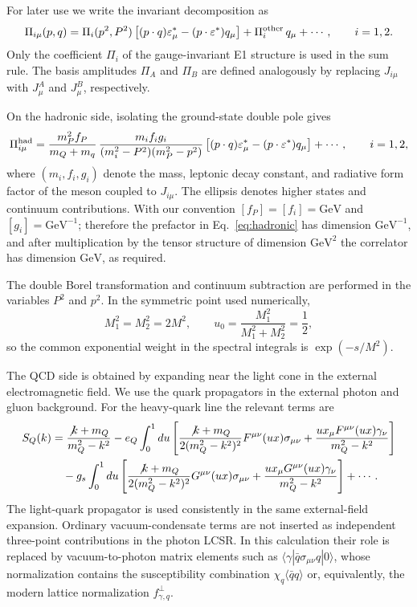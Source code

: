\documentclass[aps,prd,preprint,nofootinbib,superscriptaddress]{revtex4-2}
\newcommand{\GeV}{\mathrm{GeV}}
\newcommand{\qqbar}{\langle\bar q q\rangle}
\begin{document}
For later use we write the invariant decomposition as
\begin{equation}
  \Pi_{i\mu}(p,q)
  =
  \Pi_i(p^2,P^2)
  \left[(p\cdot q)\varepsilon_\mu^*
  -(p\cdot\varepsilon^*)q_\mu\right]
  +\Pi_i^{\rm other}\,q_\mu+\cdots ,
  \qquad i=1,2 .
  \label{eq:invariant-decomp}
\end{equation}
Only the coefficient $\Pi_i$ of the gauge-invariant E1 structure is used in
the sum rule.  The basis amplitudes $\Pi_A$ and $\Pi_B$ are defined analogously
by replacing $J_{i\mu}$ with $J_\mu^A$ and $J_\mu^B$, respectively.

On the hadronic side, isolating the ground-state double pole gives
\begin{equation}
  \Pi_{i\mu}^{\rm had}=
  \frac{m_P^2 f_P}{m_Q+m_q}\,
  \frac{m_i f_i g_i}
  {(m_i^2-P^2)(m_P^2-p^2)}
  \left[(p\cdot q)\varepsilon_\mu^*
  -(p\cdot\varepsilon^*)q_\mu\right]+\cdots ,
  \qquad i=1,2,
  \label{eq:hadronic}
\end{equation}
where $(m_i,f_i,g_i)$ denote the mass, leptonic decay constant, and radiative
form factor of the meson coupled to $J_{i\mu}$.  The ellipsis denotes higher
states and continuum contributions.  With our convention $[f_P]=[f_i]=\GeV$ and
$[g_i]=\GeV^{-1}$; therefore the prefactor in Eq.~\eqref{eq:hadronic} has
dimension $\GeV^{-1}$, and after multiplication by the tensor structure of
dimension $\GeV^2$ the correlator has dimension $\GeV$, as required.

The double Borel transformation and continuum subtraction are performed in
the variables $P^2$ and $p^2$.  In the symmetric point used numerically,
\begin{equation}
  M_1^2=M_2^2=2M^2,\qquad
  u_0=\frac{M_1^2}{M_1^2+M_2^2}=\frac12 ,
  \label{eq:borel-defs}
\end{equation}
so the common exponential weight in the spectral integrals is
$\exp(-s/M^2)$.

The QCD side is obtained by expanding near the light cone in the external
electromagnetic field.  We use the quark propagators in the external photon
and gluon background.  For the heavy-quark line the relevant terms are
\begin{align}
  S_Q(k) &=
  \frac{\not k+m_Q}{m_Q^2-k^2}
  -e_Q\int_0^1du
  \left[
  \frac{\not k+m_Q}{2(m_Q^2-k^2)^2}
  F^{\mu\nu}(ux)\sigma_{\mu\nu}
  +\frac{u x_\mu F^{\mu\nu}(ux)\gamma_\nu}{m_Q^2-k^2}
  \right]
  \notag\\
  &\quad
  -g_s\int_0^1du
  \left[
  \frac{\not k+m_Q}{2(m_Q^2-k^2)^2}
  G^{\mu\nu}(ux)\sigma_{\mu\nu}
  +\frac{u x_\mu G^{\mu\nu}(ux)\gamma_\nu}{m_Q^2-k^2}
  \right]+\cdots .
  \label{eq:heavy-prop}
\end{align}
The light-quark propagator is used consistently in the same external-field
expansion.  Ordinary vacuum-condensate terms are not inserted as independent
three-point contributions in the photon LCSR.  In this calculation their role is
replaced by vacuum-to-photon matrix elements such as
$\langle\gamma|\bar q\sigma_{\mu\nu}q|0\rangle$, whose normalization contains
the susceptibility combination $\chi_q\qqbar$ or, equivalently, the modern
lattice normalization $f_{\gamma,q}^{\perp}$.
\end{document}

